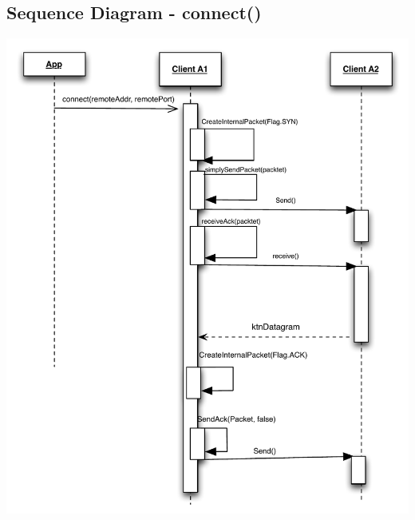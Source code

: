 \documentclass{article}
\begin{document}
\subsection{Sequence Diagram - connect()}
\includegraphics[scale=0.95]{ktnConnect.pdf}
\end{document}
